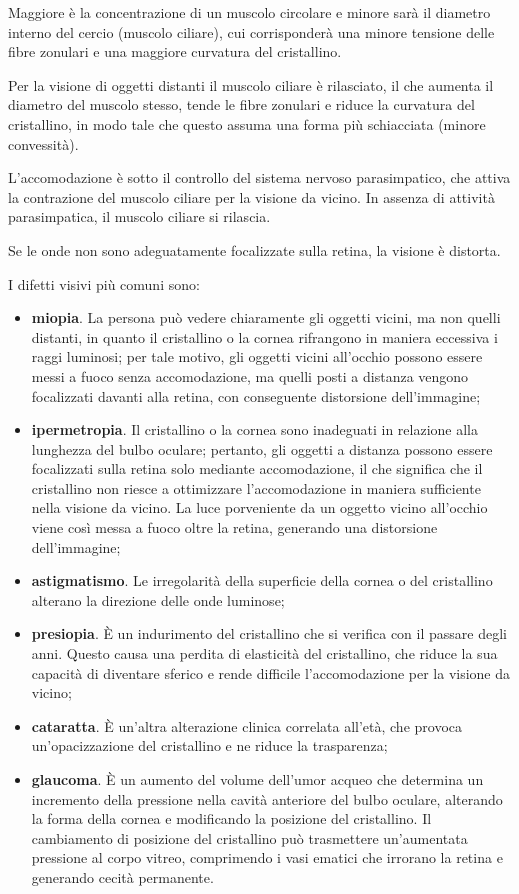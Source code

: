 \documentclass[]{article}
\begin{document}
Maggiore è la concentrazione di un muscolo circolare e minore sarà il
diametro interno del cercio (muscolo ciliare), cui corrisponderà una
minore tensione delle fibre zonulari e una maggiore curvatura del
cristallino.

Per la visione di oggetti distanti il muscolo ciliare è rilasciato, il
che aumenta il diametro del muscolo stesso, tende le fibre zonulari e
riduce la curvatura del cristallino, in modo tale che questo assuma una
forma più schiacciata (minore convessità).

L'accomodazione è sotto il controllo del sistema nervoso parasimpatico,
che attiva la contrazione del muscolo ciliare per la visione da vicino.
In assenza di attività parasimpatica, il muscolo ciliare si rilascia.

Se le onde non sono adeguatamente focalizzate sulla retina, la visione è
distorta.

I difetti visivi più comuni sono:

\begin{itemize}
\itemsep1pt\parskip0pt
\item
  \textbf{miopia}. La persona può vedere chiaramente gli oggetti vicini,
  ma non quelli distanti, in quanto il cristallino o la cornea
  rifrangono in maniera eccessiva i raggi luminosi; per tale motivo, gli
  oggetti vicini all'occhio possono essere messi a fuoco senza
  accomodazione, ma quelli posti a distanza vengono focalizzati davanti
  alla retina, con conseguente distorsione dell'immagine;
\item
  \textbf{ipermetropia}. Il cristallino o la cornea sono inadeguati in
  relazione alla lunghezza del bulbo oculare; pertanto, gli oggetti a
  distanza possono essere focalizzati sulla retina solo mediante
  accomodazione, il che significa che il cristallino non riesce a
  ottimizzare l'accomodazione in maniera sufficiente nella visione da
  vicino. La luce porveniente da un oggetto vicino all'occhio viene così
  messa a fuoco oltre la retina, generando una distorsione
  dell'immagine;
\item
  \textbf{astigmatismo}. Le irregolarità della superficie della cornea o
  del cristallino alterano la direzione delle onde luminose;
\item
  \textbf{presiopia}. È un indurimento del cristallino che si verifica
  con il passare degli anni. Questo causa una perdita di elasticità del
  cristallino, che riduce la sua capacità di diventare sferico e rende
  difficile l'accomodazione per la visione da vicino;
\item
  \textbf{cataratta}. È un'altra alterazione clinica correlata all'età,
  che provoca un'opacizzazione del cristallino e ne riduce la
  trasparenza;
\item
  \textbf{glaucoma}. È un aumento del volume dell'umor acqueo che
  determina un incremento della pressione nella cavità anteriore del
  bulbo oculare, alterando la forma della cornea e modificando la
  posizione del cristallino. Il cambiamento di posizione del cristallino
  può trasmettere un'aumentata pressione al corpo vitreo, comprimendo i
  vasi ematici che irrorano la retina e generando cecità permanente.
\end{itemize}
\end{document}
